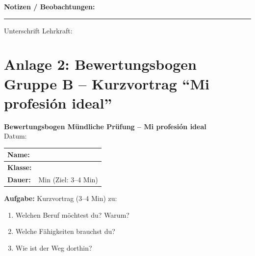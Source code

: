 \documentclass[11pt,a4paper]{article}
\begin{document}
\vspace{1em}

\textbf{Notizen / Beobachtungen:}

\vspace{4cm}

\hrule

\vspace{0.5em}
Unterschrift Lehrkraft: \underline{\hspace{6cm}}

\newpage

\section*{Anlage 2: Bewertungsbogen Gruppe B -- Kurzvortrag ``Mi profesión ideal''}

\begin{center}
\textbf{\large Bewertungsbogen Mündliche Prüfung -- Mi profesión ideal}\\[0.5em]
Datum: \underline{\hspace{2cm}}
\end{center}

\vspace{0.5em}

\begin{tabular}{|l|l|}
\hline
\textbf{Name:} & \underline{\hspace{7cm}} \\
\hline
\textbf{Klasse:} & \underline{\hspace{7cm}} \\
\hline
\textbf{Dauer:} & \underline{\hspace{3cm}} Min (Ziel: 3--4 Min) \\
\hline
\end{tabular}

\vspace{1em}

\textbf{Aufgabe:} Kurzvortrag (3--4 Min) zu:
\begin{enumerate}
    \item Welchen Beruf möchtest du? Warum?
    \item Welche Fähigkeiten brauchst du?
    \item Wie ist der Weg dorthin?
\end{enumerate}
\end{document}
